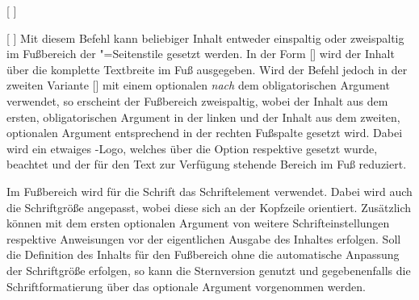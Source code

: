 \begin{Declaration*}{}
\begin{Declaration*}{}
\begin{Declaration*}{}
\begin{Declaration}[v2.04]{%
  [%
  ]%
}
\begin{Declaration}[v2.04]{%
  [%
  ]%
}
\printdeclarationlist%
%
%
Mit diesem Befehl kann beliebiger Inhalt entweder einspaltig oder zweispaltig 
im Fußbereich der "=Seitenstile gesetzt werden. In der 
Form [] wird der Inhalt über die komplette 
Textbreite im Fuß ausgegeben. Wird der Befehl jedoch in der zweiten Variante 
[] mit 
einem optionalen \emph{nach} dem obligatorischen Argument verwendet, so 
erscheint der Fußbereich zweispaltig, wobei der Inhalt aus dem ersten, 
obligatorischen Argument in der linken und der Inhalt aus dem zweiten, 
optionalen Argument entsprechend in der rechten Fußspalte gesetzt wird. Dabei 
wird ein etwaiges \DDC-Logo, welches über die Option  respektive
 gesetzt wurde, beachtet und der für den Text zur Verfügung 
stehende Bereich im Fuß reduziert.

Im Fußbereich wird für die Schrift das Schriftelement   
verwendet. Dabei wird auch die Schriftgröße angepasst, wobei diese sich an der 
Kopfzeile orientiert. Zusätzlich können mit dem ersten optionalen Argument von 
 weitere Schrifteinstellungen respektive Anweisungen vor der 
eigentlichen Ausgabe des Inhaltes erfolgen. Soll die Definition des Inhalts für 
den Fußbereich ohne die automatische Anpassung der Schriftgröße erfolgen, so 
kann die Sternversion  genutzt und gegebenenfalls die 
Schriftformatierung über das optionale Argument vorgenommen werden.
\end{Declaration}
\end{Declaration}


\end{Declaration*}
\end{Declaration*}
\end{Declaration*}
